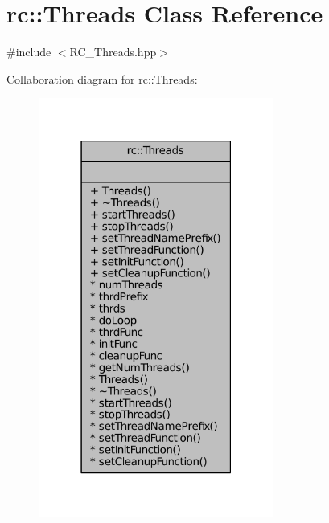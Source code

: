 \hypertarget{classrc_1_1Threads}{\section{rc\+:\+:Threads Class Reference}
\label{classrc_1_1Threads}
}


{\ttfamily \#include $<$R\+C\+\_\+\+Threads.\+hpp$>$}



Collaboration diagram for rc\+:\+:Threads\+:\nopagebreak
\begin{figure}[H]
\begin{center}
\leavevmode
\includegraphics[width=219pt]{classrc_1_1Threads__coll__graph}
\end{center}
\end{figure}
